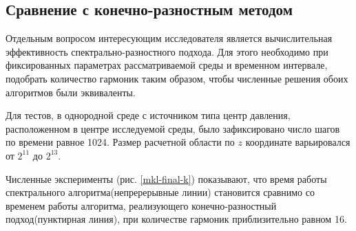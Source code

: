 \subsection{Сравнение с конечно-разностным методом}

Отдельным вопросом интересующим исследователя является вычислительная эффективность спектрально-разностного подхода.
Для этого необходимо при фиксированных параметрах рассматриваемой среды и временном интервале, подобрать количество гармоник таким образом,
чтобы численные решения обоих алгоритмов были эквиваленты.

Для тестов, в однородной среде с источником типа центр давления, расположенном в центре исследуемой среды,
было зафиксировано число шагов по времени равное 1024. Размер расчетной области по $z$ координате варьировался от $2^{11}$ до $2^{13}$.

Численные эксперименты (рис. \ref{mkl-final-k}) показывают, что время работы спектрального алгоритма(непререрывные линии) становится сравнимо со временем работы алгоритма, реализующего конечно-разностный подход(пунктирная линия), при количестве гармоник приблизительно равном 16.


\clearpage
